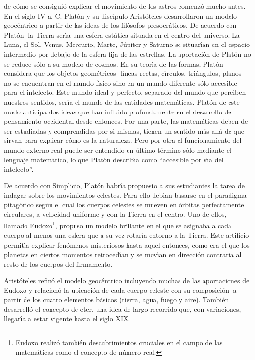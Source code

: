  de c\'omo se consigui\'o explicar el movimiento de los astros comenz\'o mucho antes. En el siglo IV a. C. Plat\'on y su disc\'\i{}pulo 
Arist\'oteles desarrollaron un modelo geoc\'entrico a partir de las ideas de los fil\'osofos presocr\'aticos. De acuerdo con Plat\'on, la Tierra ser\'\i{}a una esfera est\'atica situada en el centro del universo. La Luna, el Sol, Venus, Mercurio, Marte, J\'upiter y Saturno se situar\'\i{}an en el espacio intermedio por debajo de la esfera fija de las estrellas. La aportaci\'on de Plat\'on no se reduce s\'olo a su modelo de cosmos. En su teor\'\i{}a de las formas, Plat\'on considera que los objetos geom\'etricos -l\'\i{}neas rectas, c\'\i{}rculos, tri\'angulos, planos- no se encuentran en el mundo f\'\i{}sico sino en un mundo diferente s\'olo accesible para el intelecto. Este mundo ideal y perfecto, separado del mundo que perciben nuestros sentidos, ser\'\i{}a el mundo de las entidades matem\'aticas. Plat\'on de este modo anticipa dos ideas que han influido profundamente en el desarrollo del pensamiento occidental desde entonces. Por una parte, las matem\'aticas deben de ser estudiadas y comprendidas por s\'\i{} mismas, tienen un sentido m\'as all\'a de que sirvan para explicar c\'omo es la naturaleza. Pero por otra el funcionamiento del mundo externo real puede ser entendido en \'ultimo t\'ermino s\'olo mediante el lenguaje matem\'atico, lo que Plat\'on describ\'\i{}a como ``accesible por v\'\i{}a del intelecto''.

De acuerdo con Simplicio, Plat\'on habr\'\i{}a propuesto a sus estudiantes la tarea de indagar sobre los movimientos celestes. Para ello deb\'\i{}an  basarse en el paradigma pitag\'orico seg\'un el cual los cuerpos celestes se mueven en \'orbitas perfectamente circulares, a velocidad uniforme y con la Tierra en el centro. Uno de ellos, llamado Eudoxo\footnote{Eudoxo realiz\'o tambi\'en descubrimientos cruciales en el campo de las matem\'aticas como el concepto de n\'umero real.}, propuso un modelo brillante en el que se asignaba a cada cuerpo al menos una esfera que a su vez rotar\'\i{}a entorno a la Tierra. Este artificio permit\'\i{}a explicar fen\'omenos misteriosos hasta aquel entonces, como era el que los planetas en ciertos momentos retroced\'\i{}an y se mov\'\i{}an en direcci\'on contraria al resto de los cuerpos del firmamento. 

Arist\'oteles refin\'o el modelo geoc\'entrico incluyendo muchas de las aportaciones de Eudoxo y relacion\'o la ubicaci\'on de cada cuerpo celeste con su composici\'on, a partir de los cuatro elementos b\'asicos (tierra, agua, fuego y aire). Tambi\'en desarroll\'o el concepto de eter, una idea de largo recorrido que, con variaciones, llegar\'\i{}a a estar vigente hasta el siglo XIX.
%
%
%
%

